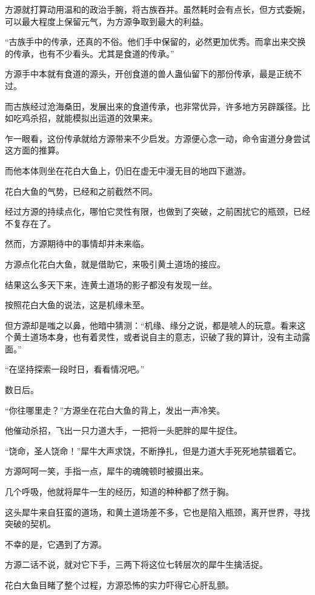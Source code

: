 \begin{this_body}
方源就打算动用温和的政治手腕，将古族吞并。虽然耗时会有点长，但方式委婉，可以最大程度上保留元气，为方源争取到最大的利益。

“古族手中的传承，还真的不俗。他们手中保留的，必然更加优秀。而拿出来交换的传承，也有不少看头。尤其是食道的传承。”

方源手中本就有食道的源头，开创食道的兽人蛊仙留下的那份传承，最是正统不过。

而古族经过沧海桑田，发展出来的食道传承，也非常优异，许多地方另辟蹊径。比如吃鸡杀招，就能模拟出运道的效果来。

乍一眼看，这份传承就给方源带来不少启发。方源便心念一动，命令宙道分身尝试这方面的推算。

而他本体则坐在花白大鱼上，仍旧在虚无中漫无目的地四下遨游。

花白大鱼的气势，已经和之前截然不同。

经过方源的持续点化，哪怕它灵性有限，也做到了突破，之前困扰它的瓶颈，已经不复存在了。

然而，方源期待中的事情却并未来临。

方源点化花白大鱼，就是借助它，来吸引黄土道场的接应。

结果这么多天下来，连黄土道场的影子都没有发现一丝。

按照花白大鱼的说法，这是机缘未至。

但方源却是嗤之以鼻，他暗中猜测：“机缘、缘分之说，都是唬人的玩意。看来这个黄土道场本身，也有着灵性，或者说自主的意志，识破了我的算计，没有主动露面。”

“在坚持探索一段时日，看看情况吧。”

数日后。

“你往哪里走？”方源坐在花白大鱼的背上，发出一声冷笑。

他催动杀招，飞出一只力道大手，一把将一头肥胖的犀牛捉住。

“饶命，圣人饶命！”犀牛大声求饶，不断挣扎，但是力道大手死死地禁锢着它。

方源呵呵一笑，手指一点，犀牛的魂魄顿时被摄出来。

几个呼吸，他就将犀牛一生的经历，知道的种种都了然于胸。

这头犀牛来自狂蛮的道场，和黄土道场差不多，它也是陷入瓶颈，离开世界，寻找突破的契机。

不幸的是，它遇到了方源。

方源二话不说，就对它下手，三两下将这位七转层次的犀牛生擒活捉。

花白大鱼目睹了整个过程，方源恐怖的实力吓得它心肝乱颤。


\end{this_body}
